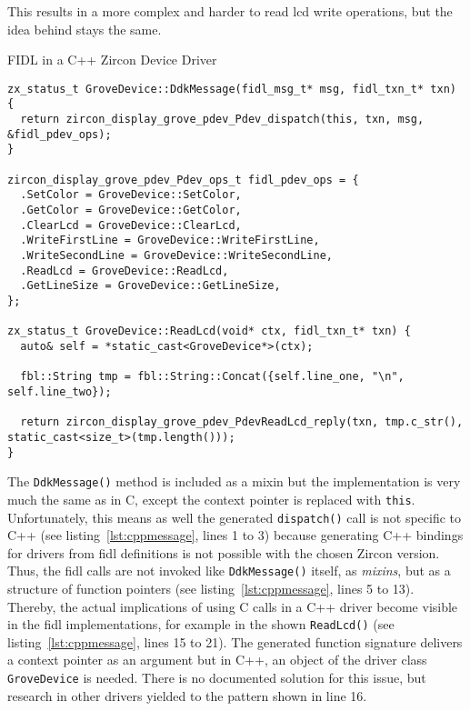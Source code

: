 This results in a more complex and harder to read \ac{lcd} write operations, but the idea behind stays the same.
%
\begin{listing} [H]
\caption{FIDL in a C++ Zircon Device Driver}
\label{lst:cppmessage}
\begin{verbatim}
zx_status_t GroveDevice::DdkMessage(fidl_msg_t* msg, fidl_txn_t* txn) {
  return zircon_display_grove_pdev_Pdev_dispatch(this, txn, msg, &fidl_pdev_ops);
}

zircon_display_grove_pdev_Pdev_ops_t fidl_pdev_ops = {
  .SetColor = GroveDevice::SetColor,
  .GetColor = GroveDevice::GetColor,
  .ClearLcd = GroveDevice::ClearLcd,
  .WriteFirstLine = GroveDevice::WriteFirstLine,
  .WriteSecondLine = GroveDevice::WriteSecondLine,
  .ReadLcd = GroveDevice::ReadLcd,
  .GetLineSize = GroveDevice::GetLineSize,
};

zx_status_t GroveDevice::ReadLcd(void* ctx, fidl_txn_t* txn) {
  auto& self = *static_cast<GroveDevice*>(ctx);

  fbl::String tmp = fbl::String::Concat({self.line_one, "\n", self.line_two});

  return zircon_display_grove_pdev_PdevReadLcd_reply(txn, tmp.c_str(), static_cast<size_t>(tmp.length()));
}
\end{verbatim}
\end{listing}
%
The \texttt{DdkMessage()} method is included as a mixin but the implementation is very much the same as in C, except the context pointer is replaced with \texttt{this}.
Unfortunately, this means as well the generated \texttt{dispatch()} call is not specific to C++ (see listing~\ref{lst:cppmessage}, lines 1 to 3) because generating C++ bindings for drivers from \ac{fidl} definitions is not possible with the chosen Zircon version.
Thus, the \ac{fidl} calls are not invoked like \texttt{DdkMessage()} itself, as \textit{mixins}, but as a structure of function pointers (see listing~\ref{lst:cppmessage}, lines 5 to 13).
Thereby, the actual implications of using C calls in a C++ driver become visible in the \ac{fidl} implementations, for example in the shown \texttt{ReadLcd()} (see listing~\ref{lst:cppmessage}, lines 15 to 21).
The generated function signature delivers a context pointer as an argument but in C++, an object of the driver class \texttt{GroveDevice} is needed.
There is no documented solution for this issue, but research in other drivers yielded to the pattern shown in line 16.
